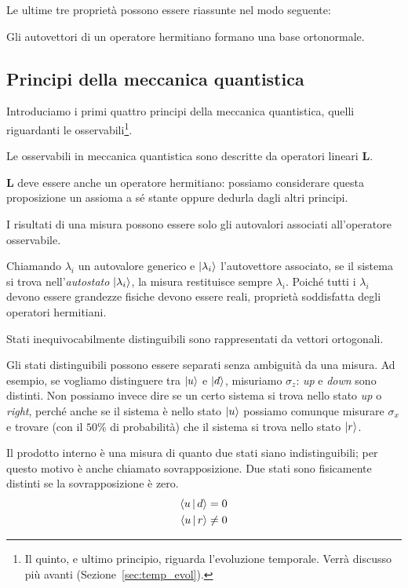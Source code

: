 Le ultime tre proprietà possono essere riassunte nel modo seguente:
\begin{theorem}
	Gli autovettori di un operatore hermitiano formano una base ortonormale.
\end{theorem} 

\subsection{Principi della meccanica quantistica}\label{sec:principles}
Introduciamo i primi quattro principi della meccanica quantistica, quelli riguardanti le osservabili\footnote{Il quinto, e ultimo principio, riguarda l'evoluzione temporale. Verrà discusso più avanti (Sezione~\ref{sec:temp_evol}).}.
\begin{principles}
	Le osservabili in meccanica quantistica sono descritte da operatori lineari $\mathbf{L}$.
\end{principles}
$\mathbf{L}$ deve essere anche un operatore hermitiano: possiamo considerare questa proposizione un assioma a sé stante oppure dedurla dagli altri principi.

\begin{principles}
	I risultati di una misura possono essere solo gli autovalori associati all'operatore osservabile.
\end{principles}                                                                                                         
Chiamando $\lambda_i$ un autovalore generico e $\Ket{\lambda_i}$ l'autovettore associato, se il sistema si trova nell'\emph{autostato} $\Ket{\lambda_i}$, la misura restituisce sempre $\lambda_i$. Poiché tutti i $\lambda_i$ devono essere grandezze fisiche devono essere reali, proprietà soddisfatta degli operatori hermitiani.

\begin{principles}
	Stati inequivocabilmente distinguibili sono rappresentati da vettori ortogonali.
\end{principles}
Gli stati distinguibili possono essere separati senza ambiguità da una misura. Ad esempio, se vogliamo distinguere tra $\Ket{u}$ e $\Ket{d}$, misuriamo $\sigma_z$: \emph{up} e \emph{down} sono distinti. Non possiamo invece dire se un certo sistema si trova nello stato \emph{up} o \emph{right}, perché anche se il sistema è nello stato $\Ket{u}$ possiamo comunque misurare $\sigma_x$ e trovare (con il $50\%$ di probabilità) che il sistema si trova nello stato $\Ket{r}$.

Il  prodotto interno è una misura di quanto due stati siano indistinguibili; per questo motivo è anche chiamato sovrapposizione. Due stati sono fisicamente distinti se la sovrapposizione è zero.
\begin{align*}
	\Braket{u|d} &= 0\\
	\Braket{u|r} &\neq 0
\end{align*}

